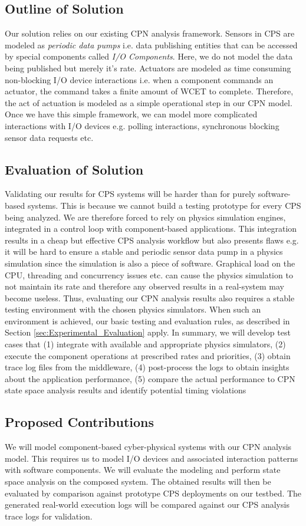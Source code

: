 \subsection{Outline of Solution}
Our solution relies on our existing CPN analysis framework. Sensors in CPS are modeled as \emph{periodic data pumps} i.e. data publishing entities that can be accessed by special components called \emph{I/O Components}. Here, we do not model the data being published but merely it's rate. Actuators are modeled as time consuming non-blocking I/O device interactions i.e. when a component commands an actuator, the command takes a finite amount of WCET to complete. Therefore, the act of actuation is modeled as a simple operational step in our CPN model. Once we have this simple framework, we can model more complicated interactions with I/O devices e.g. polling interactions, synchronous blocking sensor data requests etc.  

\subsection{Evaluation of Solution}
Validating our results for CPS systems will be harder than for purely software-based systems. This is because we cannot build a testing prototype for every CPS being analyzed. We are therefore forced to rely on physics simulation engines, integrated in a control loop with component-based applications. This integration results in a cheap but effective CPS analysis workflow but also presents flaws e.g. it will be hard to ensure a stable and periodic sensor data pump in a physics simulation since the simulation is also a piece of software. Graphical load on the CPU, threading and concurrency issues etc. can cause the physics simulation to not maintain its rate and therefore any observed results in a real-system may become useless. Thus, evaluating our CPN analysis results also requires a stable testing environment with the chosen physics simulators. When such an environment is achieved, our basic testing and evaluation rules, as described in Section \ref{sec:Experimental_Evaluation} apply. In summary, we will develop test cases that (1) integrate with available and appropriate physics simulators, (2) execute the component operations at prescribed rates and priorities, (3) obtain trace log files from the middleware, (4) post-process the logs to obtain insights about the application performance, (5) compare the actual performance to CPN state space analysis results and identify potential timing violations


\subsection{Proposed Contributions}
We will model component-based cyber-physical systems with our CPN analysis model. This requires us to model I/O devices and associated interaction patterns with software components. We will evaluate the modeling and perform state space analysis on the composed system. The obtained results will then be evaluated by comparison against prototype CPS deployments on our testbed. The generated real-world execution logs will be compared against our CPS analysis trace logs for validation. 
